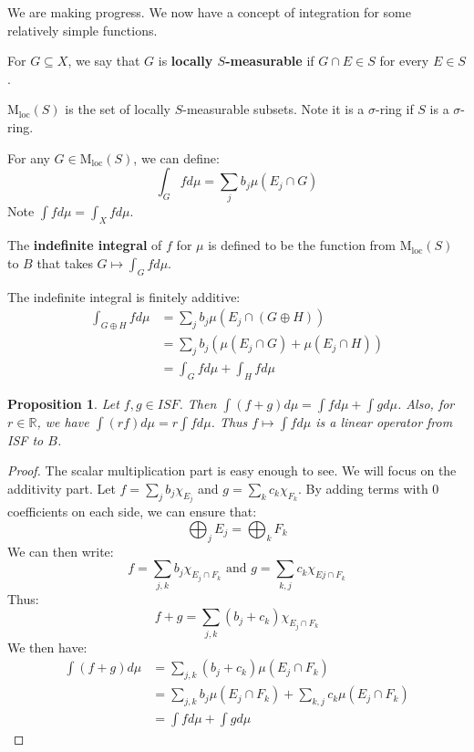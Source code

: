 \documentclass[a4paper,12pt]{report}
\newcommand{\sse} {\subseteq}
\newtheorem{prop}[theorem]{Proposition}
\newenvironment{definition}[1][Definition.]{\begin{trivlist}
\item[\hskip \labelsep {\bfseries #1}]}{\end{trivlist}}
\newenvironment{remark}[1][Remark.]{\begin{trivlist}
\item[\hskip \labelsep {\bfseries #1}]}{\end{trivlist}}
\begin{document}
	\noindent We are making progress. We now have a concept of integration for some relatively simple functions. 
	
	\begin{definition}
	For $G \sse X$, we say that $G$ is \textbf{locally $S$-measurable} if $G \cap E \in S$ for every $E \in S$. 
	\end{definition}

	\begin{definition}
	$\text{M}_{\text{loc}}(S)$ is the set of locally $S$-measurable subsets. Note it is a $\sigma$-ring if $S$ is a $\sigma$-ring. 
	\end{definition}	
	
	\begin{remark}
	For any $G \in \text{M}_{\text{loc}}(S)$, we can define:
	\[ \int_G f d\mu = \sum_j b_j \mu(E_j \cap G) \]
	Note $\int f d\mu = \int_X f d\mu$. 
	\end{remark}
	
	\begin{definition} The \textbf{indefinite integral} of $f$ for $\mu$ is defined to be the function from $\text{M}_{\text{loc}}(S)$ to $B$ 	that takes $G \mapsto \int_G f d\mu$. 
	\end{definition}
			
	\begin{remark}
	The indefinite integral is finitely additive:
	\begin{align*}
	\int_{G \oplus H} f d\mu &= \sum_j b_j \mu(E_j \cap (G \oplus H)) \\
	&= \sum_j b_j \left( \mu(E_j \cap G) + \mu(E_j \cap H) \right) \\
	&= \int_G f d\mu + \int_H f d\mu 
	\end{align*}
	\end{remark}
	
	\begin{prop}
	Let $f, g \in ISF$. Then $\int (f + g) d\mu = \int f d\mu + \int g d\mu$. Also, for $r \in \mathbb{R}$, we have $\int (rf) d\mu = r \int f d\mu$. Thus $f \mapsto \int f d\mu$ is a linear operator from ISF to $B$. 
	\end{prop}
	\begin{proof}
	The scalar multiplication part is easy enough to see. We will focus on the additivity part. Let $f = \sum_j b_j \chi_{E_j}$ and $g = \sum_k c_k \chi_{F_k}$. By adding terms with $0$ coefficients on each side, we can ensure that:
	\[ \bigoplus_j E_j = \bigoplus_k F_k \]
	We can then write:
	\[ f = \sum_{j, k} b_j \chi_{E_j \cap F_k} \text{ and } g = \sum_{k, j} c_k \chi_{Ej \cap F_k} \]
	Thus:
	\[ f + g = \sum_{j, k} (b_j + c_k) \chi_{E_j \cap F_k} \]
	We then have:
	\begin{align*}
	\int (f + g) d\mu &= \sum_{j, k} (b_j + c_k) \mu(E_j \cap F_k) \\
	&= \sum_{j, k} b_j \mu(E_j \cap F_k) + \sum_{k, j} c_k \mu(E_j \cap F_k) \\
	&= \int f d\mu + \int g d\mu 
	\end{align*}
	\end{proof}
	
\end{document}
